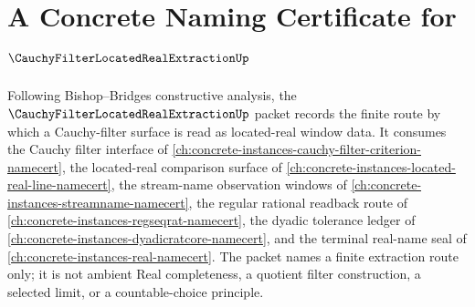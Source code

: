 \chapter{A Concrete Naming Certificate for $\CauchyFilterLocatedRealExtractionUp$}
\label{ch:concrete-instances-cauchy-filter-located-real-extraction-namecert}

Following Bishop--Bridges constructive analysis, the $\CauchyFilterLocatedRealExtractionUp$ packet records the finite route by which a Cauchy-filter surface is read as located-real window data. It consumes the Cauchy filter interface of \autoref{ch:concrete-instances-cauchy-filter-criterion-namecert}, the located-real comparison surface of \autoref{ch:concrete-instances-located-real-line-namecert}, the stream-name observation windows of \autoref{ch:concrete-instances-streamname-namecert}, the regular rational readback route of \autoref{ch:concrete-instances-regseqrat-namecert}, the dyadic tolerance ledger of \autoref{ch:concrete-instances-dyadicratcore-namecert}, and the terminal real-name seal of \autoref{ch:concrete-instances-real-namecert}. The packet names a finite extraction route only; it is not ambient Real completeness, a quotient filter construction, a selected limit, or a countable-choice principle.

